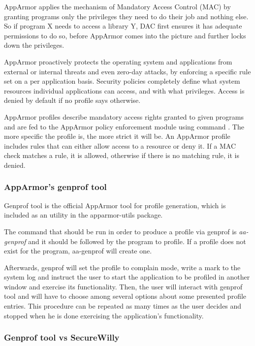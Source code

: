 AppArmor applies the mechanism of Mandatory Access Control (MAC) by granting programs only the privileges they need to do their job and nothing else. So if program X needs to access a library Y, DAC first ensures it has adequate permissions to do so, before AppArmor comes into the picture and further locks down the privileges.\cite{appsel}

AppArmor proactively protects the operating system and applications from external or internal threats and even zero-day attacks, by enforcing a specific rule set on a per application basis. Security policies completely define what system resources individual applications can access, and with what privileges. Access is denied by default if no profile says otherwise. \cite{archlsm}

AppArmor profiles describe mandatory access rights granted to given programs and are fed to the AppArmor policy enforcement module using command . The more specific the profile is, the more strict it will be. An AppArmor profile includes rules that can either allow access to a resource or deny it. If a MAC check matches a rule, it is allowed, otherwise if there is no matching rule, it is denied.

\subsubsection{AppArmor's genprof tool}

Genprof tool is the official AppArmor tool for profile generation, which is included as an utility in the apparmor-utils package.

The command that should be run in order to produce a profile via genprof is \textit{aa-genprof} and it should be followed by the program to profile. If a profile does not exist for the program, aa-genprof will create one.

Afterwards, genprof will set the profile to complain mode, write a mark to the system log and instruct the user to start the application to be profiled in another window and exercise its functionality. \cite{genprof} Then, the user will interact with genprof tool and will have to choose among several options about some presented profile entries. This procedure can be repeated as many times as the user decides and stopped when he is done exercising the application's functionality.

\subsubsection{Genprof tool vs SecureWilly}

